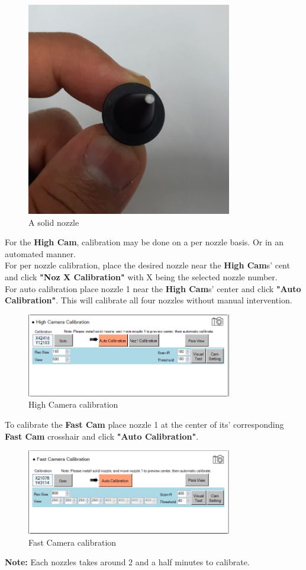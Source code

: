 \documentclass[a4paper,10pt]{report}
\begin{document}
 \begin{figure}[!htb]
 \centering
 \includegraphics[width=0.8\textwidth]{images/scrot39.png}
 \caption{A solid nozzle}
\end{figure}
\newpage
For the \textbf{High Cam}, calibration may be done on a per nozzle basis. Or in an automated manner.\\
For per nozzle calibration, place the desired nozzle near the \textbf{High Cam}s' cent and click \textbf{"Noz X Calibration"} with X being the selected nozzle number.\\
For auto calibration place nozzle 1 near the \textbf{High Cam}s' center and click \textbf{"Auto Calibration"}. This will calibrate all four nozzles without manual intervention.\\

\begin{figure}[!htb]
 \centering
 \includegraphics[width=0.8\textwidth]{images/scrot38.png}
 \caption{High Camera calibration}
\end{figure}
To calibrate the \textbf{Fast Cam} place nozzle 1 at the center of its' corresponding \textbf{Fast Cam} crosshair and click \textbf{"Auto Calibration"}.\\

 \begin{figure}[!htb]
 \centering
 \includegraphics[width=0.8\textwidth]{images/scrot40.png}
 \caption{Fast Camera calibration}
\end{figure}
\textbf{Note: } Each nozzles takes around 2 and a half minutes to calibrate.
\end{document}
